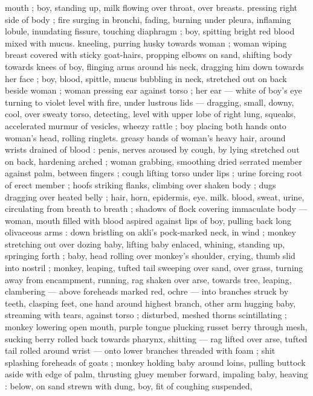 mouth ; boy, standing up, milk flowing over throat, over breasts.
pressing right side of body ; fire surging in bronchi, fading, burning
under pleura, inflaming lobule, inundating fissure, touching
diaphragm ; boy, spitting bright red blood mixed with mucus.
kneeling, purring husky towards woman ; woman wiping breast
covered with sticky goat-hairs, propping elbows on sand, shifting
body towards knees of boy, flinging arms around his neck, dragging
him down towards her face ; boy, blood, spittle, mucus bubbling in
neck, stretched out on back beside woman ; woman pressing ear
against torso ; her ear --- white of boy's eye turning to violet level
with fire, under lustrous lids --- dragging, small, downy, cool, over
sweaty torso, detecting, level with upper lobe of right lung, squeaks,
accelerated murmur of vesicles, wheezy rattle ; boy placing both
hands onto woman's head, rolling ringlets. greasy bands of woman's
heavy hair, around wrists drained of blood : penis, nerves aroused by
cough, by lying stretched out on back, hardening arched ; woman
grabbing, smoothing dried serrated member against palm, between
fingers ; cough lifting torso under lips ; urine forcing root of erect
member ; hoofs striking flanks, climbing over shaken body ; dugs
dragging over heated belly ; hair, horn, epidermis, eye. milk. blood,
sweat, urine, circulating from breath to breath ; shadows of flock
covering immaculate body --- woman, mouth filled with blood aspired
against lips of boy, pulling back long olivaceous arms : down bristling
on akli’s pock-marked neck, in wind ; monkey stretching out over
dozing baby, lifting baby enlaced, whining, standing up, springing
forth ; baby, head rolling over monkey's shoulder, crying, thumb slid
into nostril ; monkey, leaping, tufted tail sweeping over sand, over
grass, turning away from encampment, running, rag shaken over
arse, towards tree, leaping, clambering --- above foreheads marked
red, ochre --- into branches struck by teeth, clasping feet, one hand
around highest branch, other arm hugging baby, streaming with
tears, against torso ; disturbed, meshed thorns scintillating ; monkey
lowering open mouth, purple tongue plucking russet berry through
mesh, sucking berry rolled back towards pharynx, shitting --- rag
lifted over arse, tufted tail rolled around wrist --- onto lower
branches threaded with foam ; shit splashing foreheads of goats ;
monkey holding baby around loins, pulling buttock aside with edge
of palm, thrusting gluey member forward, impaling baby, heaving :
below, on sand strewn with dung, boy, fit of coughing suspended,
